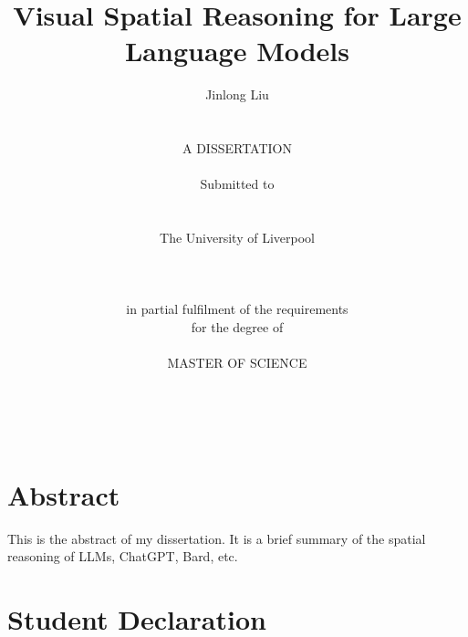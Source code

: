 \documentclass[a4paper,11pt]{report}
\begin{document}



\thispagestyle{empty}  %

\title{\LARGE
Visual Spatial Reasoning for Large Language Models}

\author{Jinlong Liu
\\    \\    \\
A DISSERTATION
\\    \\
Submitted to 
\\    \\    \\ 
The University of Liverpool
\\    \\
\\    \\
in partial fulfilment of the requirements
\\
for the degree of 
\\     \\
MASTER OF SCIENCE
\\     \\    \\    \\
}


\date{}


\maketitle


\chapter*{\center Abstract}

This is the abstract of my dissertation.  It is a brief summary of the spatial reasoning of LLMs, ChatGPT, Bard, etc.

\newpage



\chapter*{\center Student Declaration} 
\end{document}
